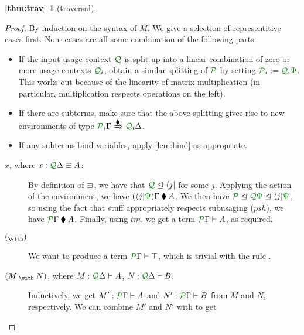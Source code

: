 \documentclass[submission,copyright,creativecommons]{eptcs}
\begin{document}
\newtheorem*{thm:trav}{\autoref{thm:trav}}
\begin{thm:trav}[traversal]
  \thmtrav
\end{thm:trav}
\begin{proof}
  By induction on the syntax of $M$.
  We give a selection of representitive cases first.
  Non- cases are all some combination of the following parts.
  \begin{itemize}
    \item If the input usage context $\resctx Q$ is split up into a linear
      combination of zero or more usage contexts $\resctx Q_{i}$, obtain a
      similar splitting of $\resctx P$ by setting
      $\resctx P_{i} := \resctx Q_{i}\rescomment\Psi$.
      This works out because of the linearity of matrix multiplication (in
      particular, multiplication respects operations on the left).
    \item If there are subterms, make sure that the above splitting gives rise
      to new environments of type
      $\resctx P_{i}\Gamma \subst{\kitrel} \resctx Q_{i}\Delta$.
    \item If any subterms bind variables, apply \autoref{lem:bind} as
      appropriate.
  \end{itemize}
  \begin{description}
    \item[ $x$, where $x : \ctx{\Delta}{Q} \lvar A$:]
      By definition of $\lvar$, we have that
      $\resctx Q \subres \langle j \rvert$ for some $j$.
      Applying the action of the environment, we have
      $(\langle j \rvert\rescomment\Psi)\Gamma \kitrel A$.
      We then have
      $\resctx P \subres \resctx Q\rescomment\Psi
      \subres \langle j \rvert\rescomment\Psi$,
      so using the fact that stuff appropriately respects subusaging
      ($\mathit{psh}$), we have $\ctx{\Gamma}{P} \kitrel A$.
      Finally, using $\mathit{tm}$, we get a term $\ctx{\Gamma}{P} \vdash A$, as
      required.
    \item[ $\eat$]
      We want to produce a term $\ctx{\Gamma}{P} \vdash \withTOne$, which is
      trivial with the rule .
    \item[ $\wth{M}{N}$, where
      $M : \ctx{\Delta}{Q} \vdash A$, $N : \ctx{\Delta}{Q} \vdash B$:]
      Inductively, we get $M' : \ctx{\Gamma}{P} \vdash A$ and
      $N' : \ctx{\Gamma}{P} \vdash B$ from
      $M$ and $N$, respectively.
      We can combine $M'$ and $N'$ with  to get

\end{description}
\end{proof}
\end{document}
